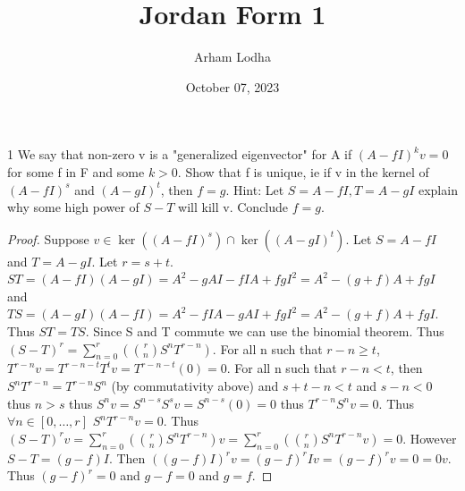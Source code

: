 \documentclass{article}
\begin{document}
\title{Jordan Form 1}
\author{Arham Lodha}%
\date{October 07, 2023}%
\maketitle

\begin{PROB}{1}\label{Problem 1.}
    We say that non-zero v is a "generalized eigenvector" for A if $(A - fI)^k v =0$ for some f in F and some $k > 0$. Show that f is unique, ie if v in the kernel of $(A - fI)^s$ and $(A - gI)^t$, then $f =g$. Hint: Let $S = A - fI, T = A -g I$ explain why some high power of $S-T$ will kill v. Conclude $f = g$.
\end{PROB}
\begin{proof}
    Suppose $v \in \ker((A - fI)^s) \cap \ker((A - gI)^t)$. Let $S = A - fI$ and $T = A - gI$. Let $r = s + t$. $ST = (A - fI)(A - gI) = A^2 - gAI - fIA + fgI^2 = A^2 - (g + f)A + fgI$ and $TS = (A - gI)(A - fI) = A^2 - fIA - gAI + fgI^2 = A^2 - (g + f)A + fgI$. Thus $ST = TS$. Since S and T commute we can use the binomial theorem. Thus $(S - T)^r = \sum_{n=0}^{r}\left({r \choose n} S^{n}T^{r - n}\right)$. For all n such that $r - n \geq t$, $T^{r - n}v = T^{r - n - t}T^{t}v = T^{r - n - t}(0) = 0$. For all n such that $r - n < t$, then $S^nT^{r-n} = T^{r-n}S^n$ (by commutativity above) and $s + t - n < t$ and $s - n < 0$ thus $n > s$ thus $S^{n}v = S^{n - s}S^{s}v = S^{n - s}(0) = 0$ thus $T^{r-n}S^nv = 0$. Thus $\forall n \in [0, \ldots, r]$ $S^nT^{r - n}v = 0$. Thus $(S - T)^rv = \sum_{n=0}^{r}\left({r \choose n} S^{n}T^{r - n}\right)v = \sum_{n=0}^{r}\left({r \choose n} S^{n}T^{r - n}v\right) = 0$. However $S - T = (g - f)I$. Then $((g-f)I)^rv = (g-f)^rIv = (g-f)^rv = 0 = 0v$. Thus $(g-f)^r = 0$ and $g-f = 0$ and $g = f$.
\end{proof}

\bigskip
\end{document}
